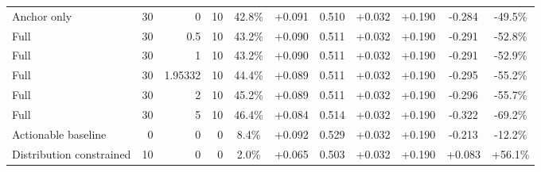 \begin{table}[htbp]
\begin{tabular}{lrrrccccccc}
Anchor only & 30 & 0 & 10 & 42.8\% & +0.091 & 0.510 & +0.032 & +0.190 & -0.284 & -49.5\% \\
Full & 30 & 0.5 & 10 & 43.2\% & +0.090 & 0.511 & +0.032 & +0.190 & -0.291 & -52.8\% \\
Full & 30 & 1 & 10 & 43.2\% & +0.090 & 0.511 & +0.032 & +0.190 & -0.291 & -52.9\% \\
Full & 30 & 1.95332 & 10 & 44.4\% & +0.089 & 0.511 & +0.032 & +0.190 & -0.295 & -55.2\% \\
Full & 30 & 2 & 10 & 45.2\% & +0.089 & 0.511 & +0.032 & +0.190 & -0.296 & -55.7\% \\
Full & 30 & 5 & 10 & 46.4\% & +0.084 & 0.514 & +0.032 & +0.190 & -0.322 & -69.2\% \\
Actionable baseline & 0 & 0 & 0 & 8.4\% & +0.092 & 0.529 & +0.032 & +0.190 & -0.213 & -12.2\% \\
Distribution constrained & 10 & 0 & 0 & 2.0\% & +0.065 & 0.503 & +0.032 & +0.190 & +0.083 & +56.1\% \\
\bottomrule
\end{tabular}
\end{table}